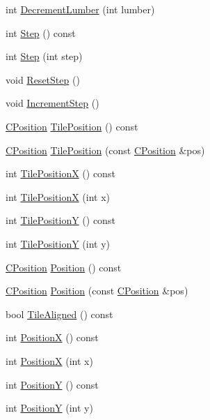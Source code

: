 \begin{DoxyCompactItemize}
int \hyperlink{classCPlayerAsset_a95f968ddfe0ec332764a730bced03834}{Decrement\+Lumber} (int lumber)
\item 
int \hyperlink{classCPlayerAsset_a787d4ac869cf7b5525b9a81f5d1bb5b1}{Step} () const
\item 
int \hyperlink{classCPlayerAsset_aaa8c5b62f8c2c3bf05443c88e1619517}{Step} (int step)
\item 
void \hyperlink{classCPlayerAsset_ae94600f78d050944f4d93dcbbf8c0ee0}{Reset\+Step} ()
\item 
void \hyperlink{classCPlayerAsset_aa1d39b408fd5aa11f2c3a19ef4d3895d}{Increment\+Step} ()
\item 
\hyperlink{classCPosition}{C\+Position} \hyperlink{classCPlayerAsset_a23354232e5585574bc8e12c1fdb37ad9}{Tile\+Position} () const
\item 
\hyperlink{classCPosition}{C\+Position} \hyperlink{classCPlayerAsset_a6d84105b6db136a6846fcaf80dba3747}{Tile\+Position} (const \hyperlink{classCPosition}{C\+Position} \&pos)
\item 
int \hyperlink{classCPlayerAsset_aeabaa8fe7161cce571b6c4d2f7180085}{Tile\+PositionX} () const
\item 
int \hyperlink{classCPlayerAsset_ad3a0b4bafbfa9021b59925a5c3364cd5}{Tile\+PositionX} (int x)
\item 
int \hyperlink{classCPlayerAsset_a189adb25bf0a45117a9c0bb36b45e6a4}{Tile\+PositionY} () const
\item 
int \hyperlink{classCPlayerAsset_ad3ce562cbd27e2c35abe968a7ff19cd6}{Tile\+PositionY} (int y)
\item 
\hyperlink{classCPosition}{C\+Position} \hyperlink{classCPlayerAsset_aed5b55f9b2f2771ebac193275d378799}{Position} () const
\item 
\hyperlink{classCPosition}{C\+Position} \hyperlink{classCPlayerAsset_a8c3ed4ab81f79aa28faec6bf790a0a79}{Position} (const \hyperlink{classCPosition}{C\+Position} \&pos)
\item 
bool \hyperlink{classCPlayerAsset_aaaea60176986f3e4f464bf5cec056521}{Tile\+Aligned} () const
\item 
int \hyperlink{classCPlayerAsset_a9cf8961ac97f2928d1e08bc4f311f220}{PositionX} () const
\item 
int \hyperlink{classCPlayerAsset_a3b0981638b2e86e1ffb211365db26b41}{PositionX} (int x)
\item 
int \hyperlink{classCPlayerAsset_a4f70846298e9951489ef138847c268a5}{PositionY} () const
\item 
int \hyperlink{classCPlayerAsset_a497fe719ca97252f0ee7985e0e30518e}{PositionY} (int y)

\end{DoxyCompactItemize}
